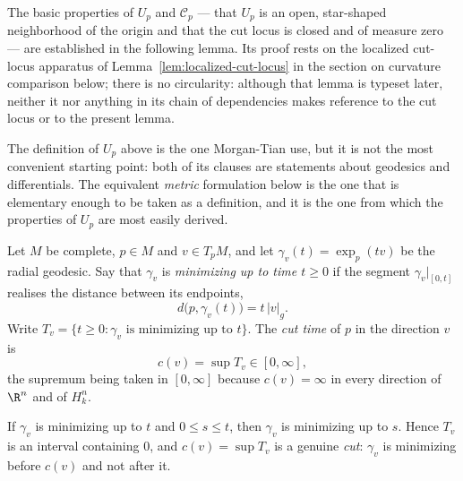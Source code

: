 The basic properties of $U_p$ and ${\mathcal C}_p$ --- that $U_p$
is an open, star-shaped neighborhood of the origin and that the
cut locus is closed and of measure zero --- are established in the
following lemma. Its proof rests on the localized cut-locus
apparatus of Lemma~\ref{lem:localized-cut-locus} in the section on
curvature comparison below; there is no circularity: although that
lemma is typeset later, neither it nor anything in its chain of
dependencies makes reference to the cut locus or to the present
lemma.

The definition of $U_p$ above is the one Morgan-Tian use, but it is not the most
convenient starting point: both of its clauses are statements about geodesics and
differentials. The equivalent \emph{metric} formulation below is the one that is
elementary enough to be taken as a definition, and it is the one from which the
properties of $U_p$ are most easily derived.

\begin{definition}
\label{def:cut-time}
\leanok



Let $M$ be complete, $p\in M$ and $v\in T_pM$, and let $\gamma_v(t)=\exp_p(tv)$ be the
radial geodesic. Say that $\gamma_v$ is \emph{minimizing up to time $t\ge 0$} if the
segment $\gamma_v|_{[0,t]}$ realises the distance between its endpoints,
$$d\bigl(p,\gamma_v(t)\bigr)=t\,\lvert v\rvert_g .$$
Write $T_v=\{t\ge0 : \gamma_v \text{ is minimizing up to } t\}$. The \emph{cut time} of
$p$ in the direction $v$ is
$$c(v)=\sup T_v\in[0,\infty],$$
the supremum being taken in $[0,\infty]$ because $c(v)=\infty$ in every direction of
$\R^n$ and of $H^n_k$.
\end{definition}

\begin{lemma}
\label{lem:minimizing-downward-closed}
\leanok



If $\gamma_v$ is minimizing up to $t$ and $0\le s\le t$, then $\gamma_v$ is minimizing up
to $s$. Hence $T_v$ is an interval containing $0$, and $c(v)=\sup T_v$ is a genuine
\emph{cut}: $\gamma_v$ is minimizing before $c(v)$ and not after it.
\end{lemma}

